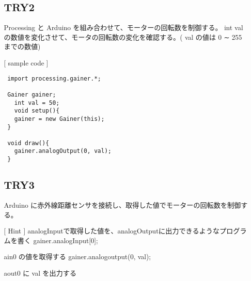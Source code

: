 \documentclass[11pt,a4paper]{jarticle}
\begin{document}
\subsection*{TRY2}
Processing と Arduino を組み合わせて、モーターの回転数を制御する。
int val の数値を変化させて、モータの回転数の変化を確認する。( val の値は 0 ∼ 255 までの数値)

[ sample code ]
\begin{lstlisting}
 import processing.gainer.*;

 Gainer gainer;
   int val = 50;
   void setup(){
   gainer = new Gainer(this);
 }
 
 void draw(){
   gainer.analogOutput(0, val);
 }
\end{lstlisting}

\subsection*{TRY3}
Arduino に赤外線距離センサを接続し、取得した値でモーターの回転数を制御する。

[ Hint ]
 analogInputで取得した値を、analogOutputに出力できるようなプログラムを書く
 gainer.analogInput[0];

ain0 の値を取得する
 gainer.analogoutput(0, val);

aout0 に val を出力する
\end{document}
